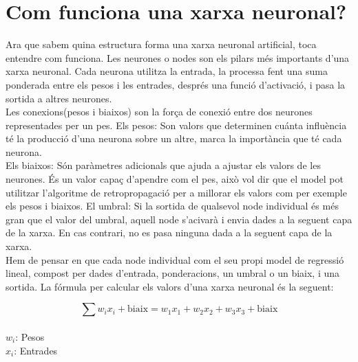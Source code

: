 \section{Com funciona una xarxa neuronal?}\label{sec:3.8}
Ara que sabem quina estructura forma una xarxa neuronal artificial, toca entendre com funciona. Les neurones o nodes son els pilars més importants d'una xarxa neuronal. Cada neurona utilitza la entrada, la processa fent una suma ponderada entre els pesos i les entrades, després una funció d'activació, i pasa la sortida a altres neurones.\\

Les conexions(pesos i biaixos) son la força de conexió entre dos neurones representades per un pes.
Els pesos: Son valors que determinen cuánta influència té la producció d'una neurona sobre un altre, marca la importància que té cada neurona.\\
Els biaixos: Són paràmetres adicionals que ajuda a ajustar els valors de les neurones. És un valor capaç d'apendre com el pes, això vol dir que el model pot utilitzar l'algoritme de retropropagació per a millorar els valors com per exemple els pesos i biaixos.
El umbral: Si la sortida de qualsevol node individual és més gran que el valor del umbral, aquell node s'acivarà i envia dades a la seguent capa de la xarxa. En cas contrari, no es pasa ninguna dada a la seguent capa de la xarxa.\\

Hem de pensar en que cada node individual com el seu propi model de regressió lineal, compost per dades d'entrada, ponderacions, un umbral o un biaix, i una sortida. La fórmula per calcular els valors d'una xarxa neuronal és la seguent:

\[
\sum w_i x_i + \text{biaix} = w_1 x_1 + w_2 x_2 + w_3 x_3 + \text{biaix}
\] \\

$w_i$: Pesos\\
$x_i$: Entrades\\

